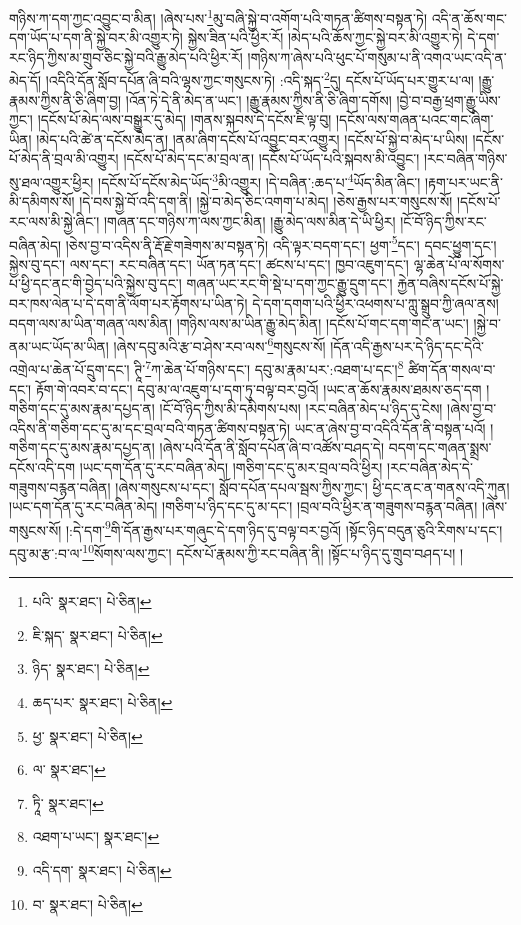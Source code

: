 གཉིས་ཀ་དག་ཀྱང་འབྱུང་བ་མིན། །ཞེས་པས་\footnote{པའི་  སྣར་ཐང་།  པེ་ཅིན། }མུ་བཞི་སྐྱེ་བ་འགོག་པའི་གཏན་ཚིགས་བསྟན་ཏེ། འདི་ན་ཆོས་གང་དག་ཡོད་པ་དག་ནི་སྐྱེ་བར་མི་འགྱུར་ཏེ། སྐྱེས་ཟིན་པའི་ཕྱིར་རོ། །མེད་པའི་ཆོས་ཀྱང་སྐྱེ་བར་མི་འགྱུར་ཏེ། དེ་དག་རང་ཉིད་ཀྱིས་མ་གྲུབ་ཅིང་སྐྱེ་བའི་རྒྱུ་མེད་པའི་ཕྱིར་རོ། །གཉིས་ཀ་ཞེས་པའི་ཕུང་པོ་གསུམ་པ་ནི་འགའ་ཡང་འདི་ན་མེད་དོ། །འདིའི་དོན་སློབ་དཔོན་ཞི་བའི་ལྷས་ཀྱང་གསུངས་ཏེ། :འདི་སྐད་\footnote{ཇི་སྐད་  སྣར་ཐང་།  པེ་ཅིན། }དུ། དངོས་པོ་ཡོད་པར་གྱུར་པ་ལ། །རྒྱུ་རྣམས་ཀྱིས་ནི་ཅི་ཞིག་བྱ། །འོན་ཏེ་དེ་ནི་མེད་ན་ཡང་། །རྒྱུ་རྣམས་ཀྱིས་ནི་ཅི་ཞིག་དགོས། །བྱེ་བ་བརྒྱ་ཕྲག་རྒྱུ་ཡིས་ཀྱང་། །དངོས་པོ་མེད་ལས་བསྒྱུར་དུ་མེད། །གནས་སྐབས་དེ་དངོས་ཇི་ལྟ་བུ། །དངོས་ལས་གཞན་པའང་གང་ཞིག་ཡིན། །མེད་པའི་ཚེ་ན་དངོས་མེད་ན། །ནམ་ཞིག་དངོས་པོ་འབྱུང་བར་འགྱུར། །དངོས་པོ་སྐྱེ་བ་མེད་པ་ཡིས། །དངོས་པོ་མེད་ནི་བྲལ་མི་འགྱུར། །དངོས་པོ་མེད་དང་མ་བྲལ་ན། །དངོས་པོ་ཡོད་པའི་སྐབས་མི་འབྱུང་། །རང་བཞིན་གཉིས་སུ་ཐལ་འགྱུར་ཕྱིར། །དངོས་པོ་དངོས་མེད་ཡོད་\footnote{ཉིད་  སྣར་ཐང་།  པེ་ཅིན། }མི་འགྱུར། །དེ་བཞིན་:ཆད་པ་\footnote{ཆད་པར་  སྣར་ཐང་།  པེ་ཅིན། }ཡོད་མིན་ཞིང་། །རྟག་པར་ཡང་ནི་མི་དམིགས་སོ། །དེ་བས་སྐྱེ་བོ་འདི་དག་ནི། །སྐྱེ་བ་མེད་ཅིང་འགག་པ་མེད། །ཅེས་རྒྱས་པར་གསུངས་སོ། །དངོས་པོ་རང་ལས་མི་སྐྱེ་ཞིང་། །གཞན་དང་གཉིས་ཀ་ལས་ཀྱང་མིན། །རྒྱུ་མེད་ལས་མིན་དེ་ཡི་ཕྱིར། །ངོ་བོ་ཉིད་ཀྱིས་རང་བཞིན་མེད། །ཅེས་བྱ་བ་འདིས་ནི་རྡོ་རྗེ་གཟེགས་མ་བསྟན་ཏེ། འདི་ལྟར་བདག་དང་། ཕྱག་\footnote{ཕྱ་  སྣར་ཐང་།  པེ་ཅིན། }དང་། དབང་ཕྱུག་དང་། སྐྱེས་བུ་དང་། ལས་དང་། རང་བཞིན་དང་། ཡོན་ཏན་དང་། ཚངས་པ་དང་། ཁྱབ་འཇུག་དང་། ལྷ་ཆེན་པོ་ལ་སོགས་པ་ཕྱི་དང་ནང་གི་བྱེད་པའི་སྐྱེས་བུ་དང་། གཞན་ཡང་རང་གི་སྡེ་པ་དག་ཀྱང་རྒྱུ་དྲུག་དང་། རྐྱེན་བཞིས་དངོས་པོ་སྐྱེ་བར་ཁས་ལེན་པ་དེ་དག་ནི་ལོག་པར་རྟོགས་པ་ཡིན་ཏེ། དེ་དག་དགག་པའི་ཕྱིར་འཕགས་པ་ཀླུ་སྒྲུབ་ཀྱི་ཞལ་ནས། བདག་ལས་མ་ཡིན་གཞན་ལས་མིན། །གཉིས་ལས་མ་ཡིན་རྒྱུ་མེད་མིན། །དངོས་པོ་གང་དག་གང་ན་ཡང་། །སྐྱེ་བ་ནམ་ཡང་ཡོད་མ་ཡིན། །ཞེས་དབུ་མའི་རྩ་བ་ཤེས་རབ་ལས་\footnote{ལ་  སྣར་ཐང་། }གསུངས་སོ། །དོན་འདི་རྒྱས་པར་དེ་ཉིད་དང་དེའི་འགྲེལ་པ་ཆེན་པོ་དྲུག་དང་། ཊཱི་\footnote{ཏཱི་  སྣར་ཐང་། }ཀ་ཆེན་པོ་གཉིས་དང་། དབུ་མ་རྣམ་པར་:འཐག་པ་དང་།\footnote{འཐག་པ་ཡང་།  སྣར་ཐང་། } ཚིག་དོན་གསལ་བ་དང་། རྟོག་གེ་འབར་བ་དང་། དབུ་མ་ལ་འཇུག་པ་དག་ཏུ་བལྟ་བར་བྱའོ། །ཡང་ན་ཆོས་རྣམས་ཐམས་ཅད་དག །གཅིག་དང་དུ་མས་རྣམ་དཔྱད་ན། །ངོ་བོ་ཉིད་ཀྱིས་མི་དམིགས་པས། །རང་བཞིན་མེད་པ་ཉིད་དུ་ངེས། །ཞེས་བྱ་བ་འདིས་ནི་གཅིག་དང་དུ་མ་དང་བྲལ་བའི་གཏན་ཚིགས་བསྟན་ཏེ། ཡང་ན་ཞེས་བྱ་བ་འདིའི་དོན་ནི་བསྟན་པའོ། །གཅིག་དང་དུ་མས་རྣམ་དཔྱད་ན། །ཞེས་པའི་དོན་ནི་སློབ་དཔོན་ཞི་བ་འཚོས་བཤད་དེ། བདག་དང་གཞན་སྨྲས་དངོས་འདི་དག །ཡང་དག་དོན་དུ་རང་བཞིན་མེད། །གཅིག་དང་དུ་མར་བྲལ་བའི་ཕྱིར། །རང་བཞིན་མེད་དེ་གཟུགས་བརྙན་བཞིན། །ཞེས་གསུངས་པ་དང་། སློབ་དཔོན་དཔལ་སྦས་ཀྱིས་ཀྱང་། ཕྱི་དང་ནང་ན་གནས་འདི་ཀུན། །ཡང་དག་དོན་དུ་རང་བཞིན་མེད། །གཅིག་པ་ཉིད་དང་དུ་མ་དང་། །བྲལ་བའི་ཕྱིར་ན་གཟུགས་བརྙན་བཞིན། །ཞེས་གསུངས་སོ། །:དེ་དག་\footnote{འདི་དག་  སྣར་ཐང་།  པེ་ཅིན། }གི་དོན་རྒྱས་པར་གཞུང་དེ་དག་ཉིད་དུ་བལྟ་བར་བྱའོ། །སྟོང་ཉིད་བདུན་ཅུའི་རིགས་པ་དང་། དབུ་མ་རྩ་:བ་ལ་\footnote{བ་  སྣར་ཐང་།  པེ་ཅིན། }སོགས་ལས་ཀྱང་། དངོས་པོ་རྣམས་ཀྱི་རང་བཞིན་ནི། །སྟོང་པ་ཉིད་དུ་གྲུབ་བཤད་པ། །
